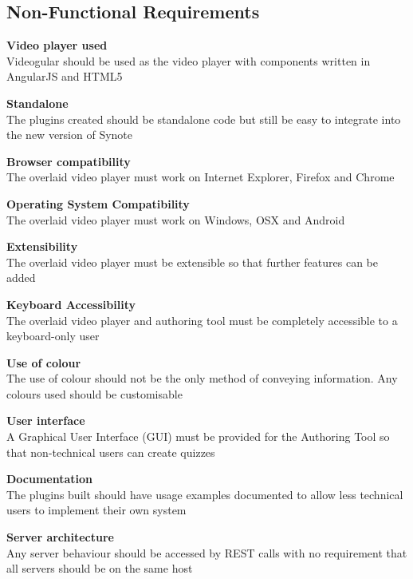 \subsection{Non-Functional Requirements}
\begin{requirement}[%
 label=\textbf{N\arabic*}]
\item \textbf{Video player used} \hfill \\ Videogular should be used as the video player with components written in AngularJS and HTML5 \label{Req:Video player used}
\item \textbf{Standalone} \hfill \\ The plugins created should be standalone code but still be easy to integrate into the new version of Synote \label{Req:Standalone}
\item \textbf{Browser compatibility} \hfill \\ The overlaid video player must work on Internet Explorer, Firefox and Chrome \label{Req:Browser compatibility}
\item \textbf{Operating System Compatibility} \hfill \\ The overlaid video player must work on Windows, OSX and Android \label{Req:OS compatibility}
\item \textbf{Extensibility} \hfill \\ The overlaid video player must be extensible so that further features can be added \label{Req:Extensibility} 
\item \textbf{Keyboard Accessibility} \hfill \\ The overlaid video player and authoring tool must be completely accessible to a keyboard-only user \label{Req:Keyboard accessibility}
\item \textbf{Use of colour} \hfill \\ The use of colour should not be the only method of conveying information. Any colours used should be customisable \label{Req:Use of colour}
\item \textbf{User interface} \hfill \\ A Graphical User Interface (GUI) must be provided for the Authoring Tool so that non-technical users can create quizzes \label{Req:User interface}
\item \textbf{Documentation} \hfill \\ The plugins built should have usage examples documented to allow less technical users to implement their own system \label{Req:Documentation}
\item \textbf{Server architecture} \hfill \\ Any server behaviour should be accessed by \gls{REST} calls with no requirement that all servers should be on the same host \label{Req:Server architecture}
\end{requirement}

